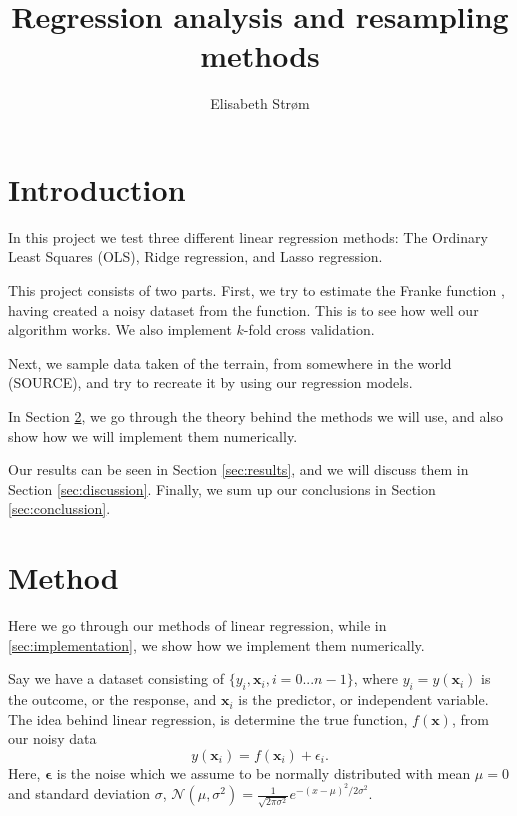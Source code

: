 \documentclass[a4paper,10pt,english]{article}
\title{Regression analysis and resampling methods}
\author{Elisabeth Strøm}
\begin{document}
\maketitle

\pagebreak

\tableofcontents

\pagebreak


\section{Introduction}
In this project we test three different linear regression methods: The Ordinary Least Squares (OLS), Ridge regression, and Lasso regression.

This project consists of two parts.
First, we try to estimate the Franke function \citep{Franke}, having created a noisy dataset from the function. This is to see how well our algorithm works. We also implement $k$-fold cross validation.

Next, we sample data taken of the terrain, from somewhere in the world (SOURCE), and try to recreate it by using our regression models.

In Section \ref{sec:method}, we go through the theory behind the methods we will use, and also show how we will implement them numerically.

Our results can be seen in Section \ref{sec:results}, and we will discuss them in Section \ref{sec:discussion}. Finally, we sum up our conclusions in Section \ref{sec:conclussion}.

%
%
\section{Method}\label{sec:method}
Here we go through our methods of linear regression, while in \ref{sec:implementation}, we show how we implement them numerically.

Say we have a dataset consisting of $\{y_i, \bm{{x}}_i, i=0...n-1\}$, where $y_i=y(\bm{{x}}_i)$ is the outcome, or the response, and $\bm{{x}}_i$ is the predictor, or independent variable.
The idea behind linear regression, is determine the true function, $f(\bm{{x}})$, from our noisy data 
\begin{equation}
y(\bm{{x}}_i)=f(\bm{{x}}_i) + \epsilon_i.
\end{equation}
Here, $\bm{{\epsilon}}$ is the noise which we assume to be normally distributed with mean $\mu=0$ and standard deviation $\sigma$, $\mathcal{N}(\mu,\sigma^2)=\frac{1}{\sqrt{2 \pi \sigma^{2}}} e^{-(x-\mu)^{2} / 2 \sigma^{2}}$.
\end{document}
